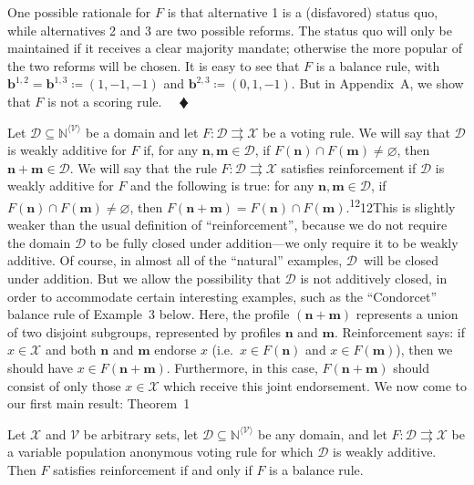 \documentclass[
]{article}
\begin{document}
One possible rationale for \(F\) is that alternative 1 is a (disfavored)
status quo, while alternatives 2 and 3 are two possible reforms. The
status quo will only be maintained if it receives a clear majority
mandate; otherwise the more popular of the two reforms will be chosen.
It is easy to see that \(F\) is a balance rule, with
\(\mathbf{b}^{1,2} = \mathbf{b}^{1,3} ≔ (1, - 1, - 1)\) and
\(\mathbf{b}^{2,3} ≔ (0,1, - 1)\). But in Appendix~A, we show that \(F\)
is not a scoring rule. \(\quad ♦\)

Let \(\mathcal{D} \subseteq \mathbb{N}^{\langle\mathcal{V}\rangle}\) be
a domain and let
\(\left. F:\mathcal{D}\rightrightarrows\mathcal{X} \right.\) be a voting
rule. We will say that \(\mathcal{D}\) is weakly additive for \(F\) if,
for any \(\mathbf{n},\mathbf{m} \in \mathcal{D}\), if
\(F\left( \mathbf{n} \right) \cap F\left( \mathbf{m} \right) \neq \varnothing\),
then \(\mathbf{n} + \mathbf{m} \in \mathcal{D}\). We will say that the
rule \(\left. F:\mathcal{D}\rightrightarrows\mathcal{X} \right.\)
satisfies reinforcement if \(\mathcal{D}\) is weakly additive for \(F\)
and the following is true: for any
\(\mathbf{n},\mathbf{m} \in \mathcal{D}\), if
\(F\left( \mathbf{n} \right) \cap F\left( \mathbf{m} \right) \neq \varnothing\),
then
\(F\left( \mathbf{n} + \mathbf{m} \right) = F\left( \mathbf{n} \right) \cap F\left( \mathbf{m} \right)\).\textsuperscript{12}12This
is slightly weaker than the usual definition of ``reinforcement'',
because we do not require the domain \(\mathcal{D}\) to be fully closed
under addition---we only require it to be weakly additive. Of course, in
almost all of the ``natural'' examples, \(\mathcal{D}\)~will be closed
under addition. But we allow the possibility that \(\mathcal{D}\) is not
additively closed, in order to accommodate certain interesting examples,
such as the ``Condorcet'' balance rule of Example~3 below. Here, the
profile \(\left( \mathbf{n} + \mathbf{m} \right)\) represents a union of
two disjoint subgroups, represented by profiles \(\mathbf{n}\) and
\(\mathbf{m}\). Reinforcement says: if \(x \in \mathcal{X}\) and both
\(\mathbf{n}\) and \(\mathbf{m}\) endorse \(x\)
(i.e.~\(x \in F\left( \mathbf{n} \right)\) and
\(x \in F\left( \mathbf{m} \right)\)), then we should have
\(x \in F\left( \mathbf{n} + \mathbf{m} \right)\). Furthermore, in this
case, \(F\left( \mathbf{n} + \mathbf{m} \right)\) should consist of only
those \(x \in \mathcal{X}\) which receive this joint endorsement. We now
come to our first main result: Theorem~1

Let \(\mathcal{X}\) and \(\mathcal{V}\) be arbitrary sets, let
\(\mathcal{D} \subseteq \mathbb{N}^{\langle\mathcal{V}\rangle}\) be any
domain, and let
\(\left. F:\mathcal{D}\rightrightarrows\mathcal{X} \right.\) be a
variable population anonymous voting rule for which \(\mathcal{D}\) is
weakly additive. Then \(F\) satisfies reinforcement if and only if \(F\)
is a balance rule.
\end{document}
